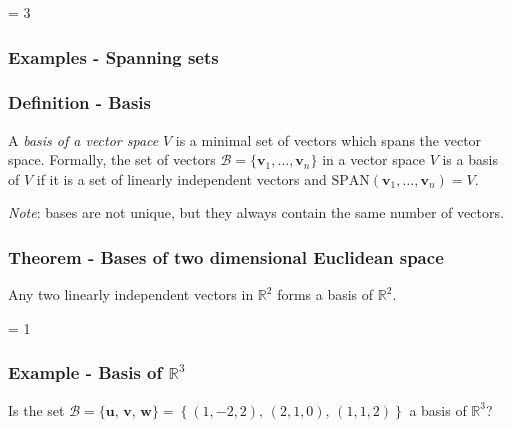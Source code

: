 \documentclass[usenames,dvipsnames,aspectratio=169,10pt]{beamer}
\def \EXAMPLEVERSION {3} %
\numberwithin{equation}{section}
\begin{document}
\ifnum \EXAMPLEVERSION = 3
\begin{frame}
\frametitle{Examples - Spanning sets}
\end{frame}
\fi 



\begin{frame}
\frametitle{Definition - Basis}

A \textit{basis of a vector space} $V$ is a minimal set of vectors which spans the vector space. Formally, the set of vectors $\mathcal{B}=\{\mathbf{v}_1, \dots, \mathbf{v}_n\}$ in a vector space $V$ is a basis of $V$ if it is a set of linearly independent vectors and $\text{SPAN}(\mathbf{v}_1, \dots, \mathbf{v}_n) = V$. 

\textit{Note}: bases are not unique, but they always contain the same number of vectors.
\end{frame}



\begin{frame}
\frametitle{Theorem - Bases of two dimensional Euclidean space}
Any two linearly independent vectors in $\mathbb{R}^2$ forms a basis of $\mathbb{R}^2$.
\end{frame}



\ifnum \EXAMPLEVERSION = 1
\begin{frame}
\frametitle{Example - Basis of $\mathbb{R}^3$}

\noindent Is the set $\mathcal{B}=\{\mathbf{u}, \, \mathbf{v}, \, \mathbf{w} \} = \left\{(1,-2,2), \, (2,1,0), \, (1,1,2) \right\}$ a basis of $\mathbb{R}^3$?
\end{frame}
\end{document}
